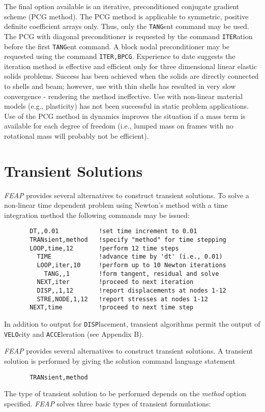 The final option available is an iterative, preconditioned conjugate
gradient scheme (PCG method).  The PCG method is applicable to symmetric,
positive definite coefficient arrays only.  Thus, only the {\tt TANG}ent
command may be used.  The PCG with diagonal preconditioner is requested
by the command {\tt ITER}\-a\-tion before the first {\tt TANG}\-ent
command.  A block nodal preconditioner may be requested using the
command {\tt ITER,BPCG}.  Experience to date suggests the iteration
method is effective and efficient only for three dimensional linear
elastic solids problems.  Success has been achieved when the solids
are directly connected to shells and beam; however, use with thin
shells has resulted in very slow convergence - rendering the method
ineffective.  Use with non-linear material models (e.g., plasticity)
has not been successful in static problem applications.  Use of the PCG
method in dynamics improves the situation if a mass term is available for
each degree of freedom (i.e., lumped mass on frames with no rotational
mass will probably not be efficient).

\section{Transient Solutions}
\label{trans}

{\sl FEAP} provides several alternatives to construct transient solutions.
To solve a non-linear time dependent problem
using Newton's method with a time integration method
the following commands may be issued:
\begin{verbatim}
       DT,,0.01           !set time increment to 0.01
       TRANsient,method   !specify "method" for time stepping
       LOOP,time,12       !perform 12 time steps
         TIME             !advance time by 'dt' (i.e., 0.01)
         LOOP,iter,10     !perform up to 10 Newton iterations
           TANG,,1        !form tangent, residual and solve
         NEXT,iter        !proceed to next iteration
         DISP,,1,12       !report displacements at nodes 1-12
         STRE,NODE,1,12   !report stresses at nodes 1-12
       NEXT,time          !proceed to next time step
\end{verbatim}
In addition to output for {\tt DISP}lacement, transient algorithms permit
the output of {\tt VELO}\-city and {\tt ACCE}l\-er\-a\-tion (see Appendix B).

{\sl FEAP} provides several alternatives to construct transient solutions.
A transient solution is performed by giving the solution command language
statement
\begin{verbatim}
       TRANsient,method
\end{verbatim}
The type of transient solution to be performed
depends on the {\it method} option specified.
{\sl FEAP} solves three basic types of transient formulations:

